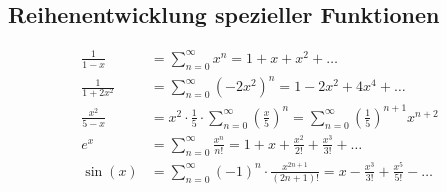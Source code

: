 \subsection{Reihenentwicklung spezieller Funktionen}
    \vspace*{-0.5em}
    \begin{align*}
        \frac{1}{1-x} &= \sum_{n=0}^\infty x^n = 1 + x + x^2 + \dots\\
        \frac{1}{1+2x^2} &= \sum_{n=0}^\infty (-2x^2)^n = 1 - 2x^2 + 4x^4 + \dots\\
        \frac{x^2}{5-x} &= x^2 \cdot \frac{1}{5} \cdot \sum_{n=0}^\infty \left( \frac{x}{5} \right)^n = \sum_{n=0}^\infty \left( \frac{1}{5} \right)^{n+1} x^{n+2}\\
        e^x &= \sum_{n=0}^\infty \frac{x^n}{n!} = 1 + x + \frac{x^2}{2!} + \frac{x^3}{3!} + \dots\\
        \sin(x) &= \sum_{n=0}^\infty (-1)^n \cdot \frac{x^{2n+1}}{(2n+1)!} = x - \frac{x^3}{3!} + \frac{x^5}{5!} - \dots
    \end{align*}